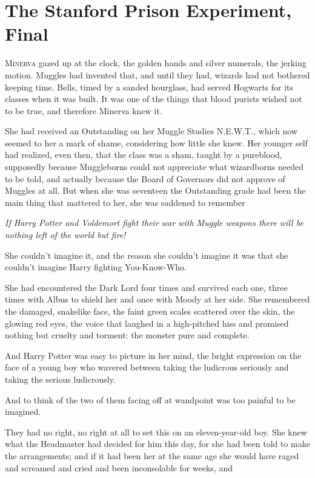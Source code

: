 \chapter{The Stanford Prison Experiment, Final}

\lettrine{M}{inerva} gazed up
at the clock, the golden hands and silver numerals, the jerking motion. Muggles
had invented that, and until they had, wizards had not bothered keeping time.
Bells, timed by a sanded hourglass, had served Hogwarts for its classes when it
was built. It was one of the things that blood purists wished not to be true,
and therefore Minerva knew it.

She had received an Outstanding on her Muggle Studies N.E.W.T., which now
seemed to her a mark of shame, considering how little she knew. Her younger
self had realized, even then, that the class was a sham, taught by a pureblood,
supposedly because Muggleborns could not appreciate what wizardborns needed to
be told, and actually because the Board of Governors did not approve of Muggles
at all. But when she was seventeen the Outstanding grade had been the main
thing that mattered to her, she was saddened to remember{\el}

\emph{If Harry Potter and Voldemort fight their war with Muggle weapons there
will be nothing left of the world but fire!}

She couldn't imagine it, and the reason she couldn't imagine it was that she
couldn't imagine Harry fighting You-Know-Who.

She had encountered the Dark Lord four times and survived each one, three times
with Albus to shield her and once with Moody at her side. She remembered the
damaged, snakelike face, the faint green scales scattered over the skin, the
glowing red eyes, the voice that laughed in a high-pitched hiss and promised
nothing but cruelty and torment: the monster pure and complete.

And Harry Potter was easy to picture in her mind, the bright expression on the
face of a young boy who wavered between taking the ludicrous seriously and
taking the serious ludicrously.

And to think of the two of them facing off at wandpoint was too painful to be
imagined.

They had no right, no right at all to set this on an eleven-year-old boy. She
knew what the Headmaster had decided for him this day, for she had been told to
make the arrangements; and if it had been her at the same age she would have
raged and screamed and cried and been inconsolable for weeks, and{\el}

